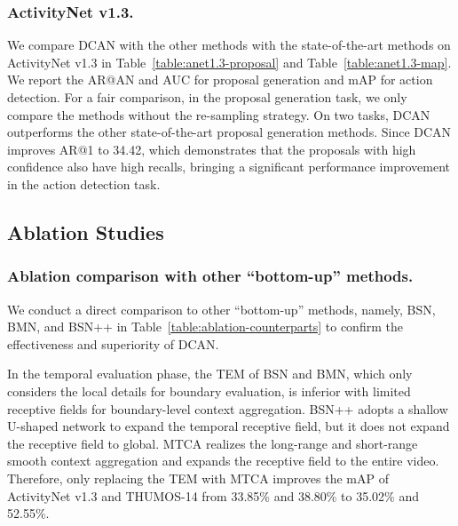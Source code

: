 \documentclass[letterpaper]{article} \usepackage{aaai22}  \usepackage{times}  \usepackage{helvet}  \usepackage{courier}  \usepackage[hyphens]{url}  \usepackage{graphicx} \urlstyle{rm} \def\UrlFont{\rm}  \usepackage{natbib}  \usepackage{caption} \DeclareCaptionStyle{ruled}{labelfont=normalfont,labelsep=colon,strut=off} \frenchspacing  \setlength{\pdfpagewidth}{8.5in}  \setlength{\pdfpageheight}{11in}  \usepackage{algorithm}
\begin{document}
\subsubsection{ActivityNet v1.3.} 
We compare DCAN with the other methods with the state-of-the-art methods on ActivityNet v1.3 in Table~\ref{table:anet1.3-proposal} and Table~\ref{table:anet1.3-map}. 
We report the AR@AN and AUC for proposal generation and mAP for action detection. 
For a fair comparison, in the proposal generation task, we only compare the methods without the re-sampling strategy.
On two tasks, DCAN outperforms the other state-of-the-art proposal generation methods.
Since DCAN improves AR@1 to 34.42, which demonstrates that the proposals with high confidence also have high recalls, bringing a significant performance improvement in the action detection task.
















\subsection{Ablation Studies}



\subsubsection{Ablation comparison with other ``bottom-up'' methods.}
We conduct a direct comparison to other ``bottom-up'' methods, namely, BSN, BMN, and BSN++ in Table~\ref{table:ablation-counterparts} to confirm the effectiveness and superiority of DCAN. 

In the temporal evaluation phase, the TEM of BSN and BMN, which only considers the local details for boundary evaluation, is inferior with limited receptive fields for boundary-level context aggregation. 
BSN++ adopts a shallow U-shaped network to expand the temporal receptive field, but it does not expand the receptive field to global.
MTCA realizes the long-range and short-range smooth context aggregation and expands the receptive field to the entire video.
Therefore, only replacing the TEM with MTCA improves the mAP of ActivityNet v1.3 and THUMOS-14 from 33.85\% and 38.80\% to 35.02\% and 52.55\%.
\end{document}
